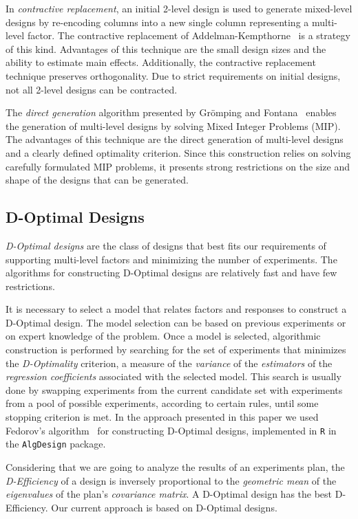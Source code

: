 \documentclass[conference]{IEEEtran}
\begin{document}
In \emph{contractive replacement}, an initial 2-level design is used to generate
mixed-level designs by re-encoding columns into a new single column representing
a multi-level factor. The contractive replacement of
Addelman-Kempthorne~\cite{addelman1961some} is a strategy of this kind.
Advantages of this technique are the small design sizes and the ability to
estimate main effects. Additionally, the contractive replacement technique
preserves orthogonality. Due to strict requirements on initial designs, not all
2-level designs can be contracted.

The \emph{direct generation} algorithm presented by Grömping and
Fontana~\cite{ulrike2018algorithm} enables the generation of multi-level
designs by solving Mixed Integer Problems (MIP). The advantages of this
technique are the direct generation of multi-level designs and a clearly defined
optimality criterion. Since this construction relies on solving carefully
formulated MIP problems, it presents strong restrictions on the size and shape
of the designs that can be generated.
\subsection{D-Optimal Designs}
\label{sec:org6c155ef}
\emph{D-Optimal designs} are the class of designs that best fits our requirements of
supporting multi-level factors and minimizing the number of experiments. The
algorithms for constructing D-Optimal designs are relatively fast and have few
restrictions.

It is necessary to select a model that relates factors and responses to
construct a D-Optimal design. The model selection can be based on previous
experiments or on expert knowledge of the problem. Once a model is selected,
algorithmic construction is performed by searching for the set of experiments
that minimizes the \emph{D-Optimality} criterion, a measure of the \emph{variance} of the
\emph{estimators} of the \emph{regression coefficients} associated with the selected
model. This search is usually done by swapping experiments from the current
candidate set with experiments from a pool of possible experiments, according to
certain rules, until some stopping criterion is met. In the approach presented
in this paper we used Fedorov's algorithm~\cite{fedorov1972theory} for
constructing D-Optimal designs, implemented in \texttt{R} in the \texttt{AlgDesign} package.

Considering that we are going to analyze the results of an experiments plan, the
\emph{D-Efficiency} of a design is inversely proportional to the \emph{geometric mean} of
the \emph{eigenvalues} of the plan's \emph{covariance matrix}. A D-Optimal design has the
best D-Efficiency. Our current approach is based on D-Optimal designs.
\end{document}

